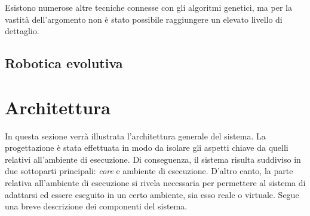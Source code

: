 \documentclass[a4paper,12pt]{article}
\begin{document}
Esistono numerose altre tecniche connesse con gli algoritmi genetici, ma per la vastità dell'argomento non è stato possibile raggiungere un elevato livello di dettaglio.
\subsection*{Robotica evolutiva}
\section{Architettura} \label{architecture}
In questa sezione verrà illustrata l'architettura generale del sistema. La progettazione è stata effettuata in modo da isolare gli aspetti chiave da quelli relativi all'ambiente di esecuzione. Di conseguenza, il sistema risulta suddiviso in due sottoparti principali: \emph{core} e ambiente di esecuzione. D'altro canto, la parte relativa all'ambiente di esecuzione si rivela necessaria per permettere al sistema di adattarsi ed essere eseguito in un certo ambiente, sia esso reale o virtuale. Segue una breve descrizione dei componenti del sistema.
\end{document}
